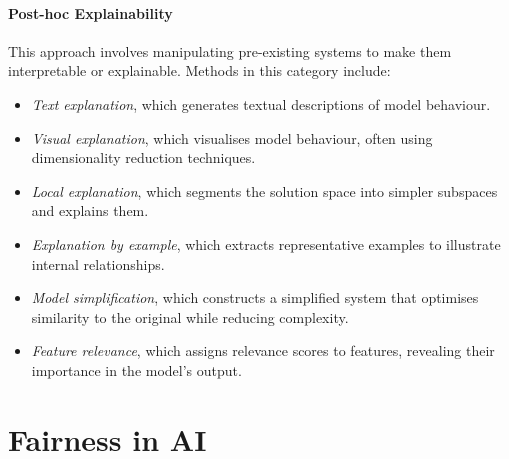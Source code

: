 \paragraph{Post-hoc Explainability}
%
This approach involves manipulating pre-existing systems to make them interpretable or explainable.
%
Methods in this category include:
%
\begin{itemize}
    \item \emph{Text explanation}, which generates textual descriptions of model behaviour.
    \item \emph{Visual explanation}, which visualises model behaviour, often using dimensionality reduction techniques.
    \item \emph{Local explanation}, which segments the solution space into simpler subspaces and explains them.
    \item \emph{Explanation by example}, which extracts representative examples to illustrate internal relationships.
    \item \emph{Model simplification}, which constructs a simplified system that optimises similarity to the original while reducing complexity.
    \item \emph{Feature relevance}, which assigns relevance scores to features, revealing their importance in the model's output.
\end{itemize}


\section[Fairness in AI]{Fairness in \gls{AI}}
\label{sec:fairness-in-ai}


